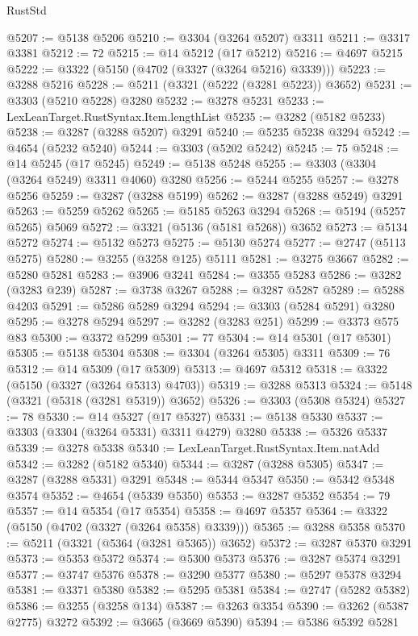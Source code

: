 \begin{lexlean}{RustStd}
\begin{coremodule}
@5207 := @5138 @5206
@5210 := @3304 (@3264 @5207) @3311
@5211 := @3317 @3381
@5212 := 72
@5215 := @14 @5212 (@17 @5212)
@5216 := @4697 @5215
@5222 := @3322 (@5150 (@4702 (@3327 (@3264 @5216) @3339)))
@5223 := @3288 @5216
@5228 := @5211 (@3321 (@5222 (@3281 @5223)) @3652)
@5231 := @3303 (@5210 @5228) @3280
@5232 := @3278 @5231
@5233 := LexLeanTarget.RustSyntax.Item.lengthList
@5235 := @3282 (@5182 @5233)
@5238 := @3287 (@3288 @5207) @3291
@5240 := @5235 @5238 @3294
@5242 := @4654 (@5232 @5240)
@5244 := @3303 (@5202 @5242)
@5245 := 75
@5248 := @14 @5245 (@17 @5245)
@5249 := @5138 @5248
@5255 := @3303 (@3304 (@3264 @5249) @3311 @4060) @3280
@5256 := @5244 @5255
@5257 := @3278 @5256
@5259 := @3287 (@3288 @5199)
@5262 := @3287 (@3288 @5249) @3291
@5263 := @5259 @5262
@5265 := @5185 @5263 @3294
@5268 := @5194 (@5257 @5265) @5069
@5272 := @3321 (@5136 (@5181 @5268)) @3652
@5273 := @5134 @5272
@5274 := @5132 @5273
@5275 := @5130 @5274
@5277 := @2747 (@5113 @5275)
@5280 := @3255 (@3258 @125) @5111
@5281 := @3275 @3667
@5282 := @5280 @5281
@5283 := @3906 @3241
@5284 := @3355 @5283
@5286 := @3282 (@3283 @239)
@5287 := @3738 @3267
@5288 := @3287 @5287
@5289 := @5288 @4203
@5291 := @5286 @5289 @3294
@5294 := @3303 (@5284 @5291) @3280
@5295 := @3278 @5294
@5297 := @3282 (@3283 @251)
@5299 := @3373 @575 @83
@5300 := @3372 @5299
@5301 := 77
@5304 := @14 @5301 (@17 @5301)
@5305 := @5138 @5304
@5308 := @3304 (@3264 @5305) @3311
@5309 := 76
@5312 := @14 @5309 (@17 @5309)
@5313 := @4697 @5312
@5318 := @3322 (@5150 (@3327 (@3264 @5313) @4703))
@5319 := @3288 @5313
@5324 := @5148 (@3321 (@5318 (@3281 @5319)) @3652)
@5326 := @3303 (@5308 @5324)
@5327 := 78
@5330 := @14 @5327 (@17 @5327)
@5331 := @5138 @5330
@5337 := @3303 (@3304 (@3264 @5331) @3311 @4279) @3280
@5338 := @5326 @5337
@5339 := @3278 @5338
@5340 := LexLeanTarget.RustSyntax.Item.natAdd
@5342 := @3282 (@5182 @5340)
@5344 := @3287 (@3288 @5305)
@5347 := @3287 (@3288 @5331) @3291
@5348 := @5344 @5347
@5350 := @5342 @5348 @3574
@5352 := @4654 (@5339 @5350)
@5353 := @3287 @5352
@5354 := 79
@5357 := @14 @5354 (@17 @5354)
@5358 := @4697 @5357
@5364 := @3322 (@5150 (@4702 (@3327 (@3264 @5358) @3339)))
@5365 := @3288 @5358
@5370 := @5211 (@3321 (@5364 (@3281 @5365)) @3652)
@5372 := @3287 @5370 @3291
@5373 := @5353 @5372
@5374 := @5300 @5373
@5376 := @3287 @5374 @3291
@5377 := @3747 @5376
@5378 := @3290 @5377
@5380 := @5297 @5378 @3294
@5381 := @3371 @5380
@5382 := @5295 @5381
@5384 := @2747 (@5282 @5382)
@5386 := @3255 (@3258 @134)
@5387 := @3263 @3354
@5390 := @3262 (@5387 @2775) @3272
@5392 := @3665 (@3669 @5390)
@5394 := @5386 @5392 @5281

\end{coremodule}
\end{lexlean}
